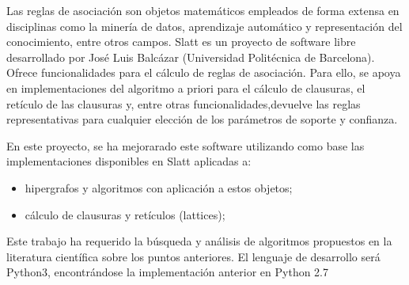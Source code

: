 Las reglas de asociación son objetos matemáticos empleados de forma extensa en disciplinas como la minería de datos, aprendizaje automático y representación del conocimiento, entre otros campos.
Slatt es un proyecto de software libre desarrollado por José Luis Balcázar (Universidad Politécnica de Barcelona). Ofrece funcionalidades para el cálculo de reglas de asociación. Para ello, se apoya en implementaciones del algoritmo a priori para el cálculo de clausuras, el retículo de las clausuras y, entre otras
funcionalidades,devuelve las reglas representativas para cualquier elección de los parámetros de soporte y confianza.

En este proyecto, se ha mejorarado este software utilizando como base las implementaciones disponibles en Slatt
aplicadas a:

\begin{itemize}
    \item hipergrafos y algoritmos con aplicación a estos objetos;
    
    \item cálculo de clausuras y retículos (lattices);
\end{itemize}


Este trabajo ha requerido la búsqueda y análisis de algoritmos propuestos en la literatura científica sobre los puntos anteriores.
El lenguaje de desarrollo será Python3, encontrándose la implementación anterior en Python 2.7
%
%



